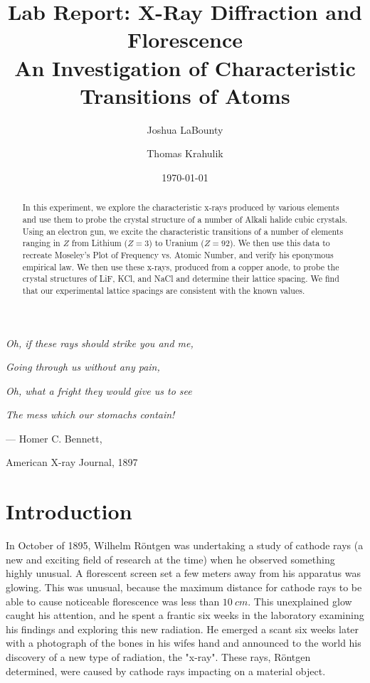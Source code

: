 \documentclass[%
 reprint,
 amsmath,amssymb,
 aps,
 pra,
]{revtex4-1}
\begin{document}

\title{\textbf{Lab Report: X-Ray Diffraction and Florescence} \\ \small{An Investigation of Characteristic Transitions of Atoms}}
\author{Joshua LaBounty}
\author{Thomas Krahulik}

\date{\today}

\begin{abstract}
	In this experiment, we explore the characteristic x-rays produced by various elements and use them to probe the crystal structure of a number of Alkali halide cubic crystals. Using an electron gun, we excite the characteristic transitions of a number of elements ranging in $Z$ from Lithium ($Z = 3$) to Uranium ($Z = 92$). We then use this data to recreate Moseley's Plot of Frequency vs. Atomic Number, and verify his eponymous empirical law. We then use these x-rays, produced from a copper anode, to probe the crystal structures of LiF, KCl, and NaCl and determine their lattice spacing. We find that our experimental lattice spacings are consistent with the known values.
\end{abstract}
\maketitle

\begin{center}
\textit{Oh, if these rays should strike you and me,}

\textit{Going through us without any pain,}

\textit{Oh, what a fright they would give us to see}

\textit{The mess which our stomachs contain!}
\end{center}

\begin{flushright}
--- Homer C. Bennett,

American X-ray Journal, 1897
\end{flushright}

\section{Introduction}

In October of 1895, Wilhelm R\"{o}ntgen was undertaking a study of cathode rays (a new and exciting field of research at the time) when he observed something highly unusual. A florescent screen set a few meters away from his apparatus was glowing\cite{xray_history}. This was unusual, because the maximum distance for cathode rays to be able to cause noticeable florescence was less than $10~cm$. This unexplained glow caught his attention, and he spent a frantic six weeks in the laboratory examining his findings and exploring this new radiation. He emerged a scant six weeks later with a photograph of the bones in his wifes hand and announced to the world his discovery of a new type of radiation, the "x-ray"\cite{rontgen_paper, 50years}. These rays, R\"{o}ntgen determined, were caused by cathode rays impacting on a material object. 
\end{document}
